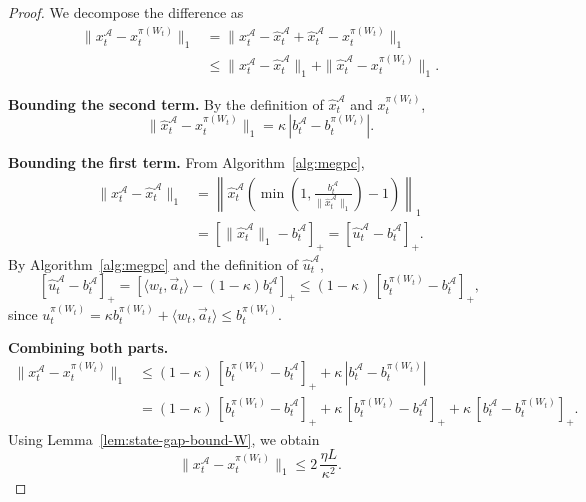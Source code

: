 \documentclass[11pt]{article}
\begin{document}
\begin{proof}
We decompose the difference as
\begin{align*}
\|x_t^{\mathcal{A}} - x_t^{\pi(W_t)}\|_1
&=
\|x_t^{\mathcal{A}} - \widehat{x}_t^{\mathcal{A}} + \widehat{x}_t^{\mathcal{A}} - x_t^{\pi(W_t)}\|_1
\\&\le
\|x_t^{\mathcal{A}} - \widehat{x}_t^{\mathcal{A}}\|_1
+ \|\widehat{x}_t^{\mathcal{A}} - x_t^{\pi(W_t)}\|_1.
\end{align*}

\textbf{Bounding the second term.}
By the definition of \(\widehat{x}_t^{\mathcal{A}}\) and \(x_t^{\pi(W_t)}\),
\[
\|\widehat{x}_t^{\mathcal{A}} - x_t^{\pi(W_t)}\|_1
=
\kappa\,|b_t^{\mathcal{A}} - b_t^{\pi(W_t)}|.
\]

\textbf{Bounding the first term.}
From Algorithm~\ref{alg:megpc},
\begin{align*}
\|x_t^{\mathcal{A}} - \widehat{x}_t^{\mathcal{A}}\|_1
&=
\left\|
\widehat{x}_t^{\mathcal{A}}
\!\left(
\min\!\left(1,\frac{b_t^{\mathcal{A}}}{\|\widehat{x}_t^{\mathcal{A}}\|_1}\right)
- 1
\right)
\right\|_1
\\&=
\left[\|\widehat{x}_t^{\mathcal{A}}\|_1 - b_t^{\mathcal{A}}\right]_+
=
[\widehat{u}_t^{\mathcal{A}} - b_t^{\mathcal{A}}]_+.
\end{align*}
By Algorithm~\ref{alg:megpc} and the definition of \(\widehat{u}_t^{\mathcal{A}}\),
\[
[\widehat{u}_t^{\mathcal{A}} - b_t^{\mathcal{A}}]_+
=
[\langle w_t, \vec{a}_t \rangle - (1-\kappa)b_t^{\mathcal{A}}]_+
\le
(1-\kappa)\,[b_t^{\pi(W_t)} - b_t^{\mathcal{A}}]_+,
\]
since \(u_t^{\pi(W_t)} = \kappa b_t^{\pi(W_t)} + \langle w_t, \vec{a}_t \rangle \le b_t^{\pi(W_t)}.\)

\textbf{Combining both parts.}
\begin{align*}
\|x_t^{\mathcal{A}} - x_t^{\pi(W_t)}\|_1
&\le
(1-\kappa)\,[b_t^{\pi(W_t)} - b_t^{\mathcal{A}}]_+
+ \kappa\,|b_t^{\mathcal{A}} - b_t^{\pi(W_t)}|
\\&=
(1-\kappa)\,[b_t^{\pi(W_t)} - b_t^{\mathcal{A}}]_+
+ \kappa\,[b_t^{\pi(W_t)} - b_t^{\mathcal{A}}]_+
+ \kappa\,[b_t^{\mathcal{A}} - b_t^{\pi(W_t)}]_+.
\end{align*}
Using Lemma~\ref{lem:state-gap-bound-W},
we obtain
\[
\|x_t^{\mathcal{A}} - x_t^{\pi(W_t)}\|_1
\le
2\,\frac{\eta L}{\kappa^2}.
\]
\end{proof}
\end{document}
